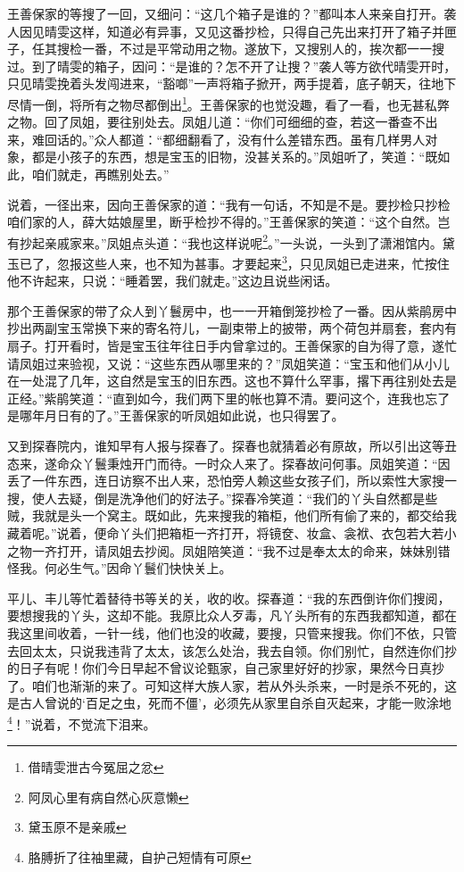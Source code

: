 \documentclass[12pt,oneside]{book}
\begin{document}
王善保家的等搜了一回，又细问：“这几个箱子是谁的？”都叫本人来亲自打开。袭人因见晴雯这样，知道必有异事，又见这番抄检，只得自己先出来打开了箱子并匣子，任其搜检一番，不过是平常动用之物。遂放下，又搜别人的，挨次都一一搜过。到了晴雯的箱子，因问：“是谁的？怎不开了让搜？”袭人等方欲代晴雯开时，只见晴雯挽着头发闯进来，“豁啷”一声将箱子掀开，两手提着，底子朝天，往地下尽情一倒，将所有之物尽都倒出\footnote{借晴雯泄古今冤屈之忿}。王善保家的也觉没趣，看了一看，也无甚私弊之物。回了凤姐，要往别处去。凤姐儿道：“你们可细细的查，若这一番查不出来，难回话的。”众人都道：“都细翻看了，没有什么差错东西。虽有几样男人对象，都是小孩子的东西，想是宝玉的旧物，没甚关系的。”凤姐听了，笑道：“既如此，咱们就走，再瞧别处去。”

说着，一径出来，因向王善保家的道：“我有一句话，不知是不是。要抄检只抄检咱们家的人，薛大姑娘屋里，断乎检抄不得的。”王善保家的笑道：“这个自然。岂有抄起亲戚家来。”凤姐点头道：“我也这样说呢\footnote{阿凤心里有病自然心灰意懒}。”一头说，一头到了潇湘馆内。黛玉已了，忽报这些人来，也不知为甚事。才要起来\footnote{黛玉原不是亲戚}，只见凤姐已走进来，忙按住他不许起来，只说：“睡着罢，我们就走。”这边且说些闲话。

那个王善保家的带了众人到丫鬟房中，也一一开箱倒笼抄检了一番。因从紫鹃房中抄出两副宝玉常换下来的寄名符儿，一副束带上的披带，两个荷包并扇套，套内有扇子。打开看时，皆是宝玉往年往日手内曾拿过的。王善保家的自为得了意，遂忙请凤姐过来验视，又说：“这些东西从哪里来的？”凤姐笑道：“宝玉和他们从小儿在一处混了几年，这自然是宝玉的旧东西。这也不算什么罕事，撂下再往别处去是正经。”紫鹃笑道：“直到如今，我们两下里的帐也算不清。要问这个，连我也忘了是哪年月日有的了。”王善保家的听凤姐如此说，也只得罢了。

又到探春院内，谁知早有人报与探春了。探春也就猜着必有原故，所以引出这等丑态来，遂命众丫鬟秉烛开门而待。一时众人来了。探春故问何事。凤姐笑道：“因丢了一件东西，连日访察不出人来，恐怕旁人赖这些女孩子们，所以索性大家搜一搜，使人去疑，倒是洗净他们的好法子。”探春冷笑道：“我们的丫头自然都是些贼，我就是头一个窝主。既如此，先来搜我的箱柜，他们所有偷了来的，都交给我藏着呢。”说着，便命丫头们把箱柜一齐打开，将镜奁、妆盒、衾袱、衣包若大若小之物一齐打开，请凤姐去抄阅。凤姐陪笑道：“我不过是奉太太的命来，妹妹别错怪我。何必生气。”因命丫鬟们快快关上。

平儿、丰儿等忙着替待书等关的关，收的收。探春道：“我的东西倒许你们搜阅，要想搜我的丫头，这却不能。我原比众人歹毒，凡丫头所有的东西我都知道，都在我这里间收着，一针一线，他们也没的收藏，要搜，只管来搜我。你们不依，只管去回太太，只说我违背了太太，该怎么处治，我去自领。你们别忙，自然连你们抄的日子有呢！你们今日早起不曾议论甄家，自己家里好好的抄家，果然今日真抄了。咱们也渐渐的来了。可知这样大族人家，若从外头杀来，一时是杀不死的，这是古人曾说的‘百足之虫，死而不僵’，必须先从家里自杀自灭起来，才能一败涂地\footnote{胳膊折了往袖里藏，自护己短情有可原}！”说着，不觉流下泪来。
\end{document}
